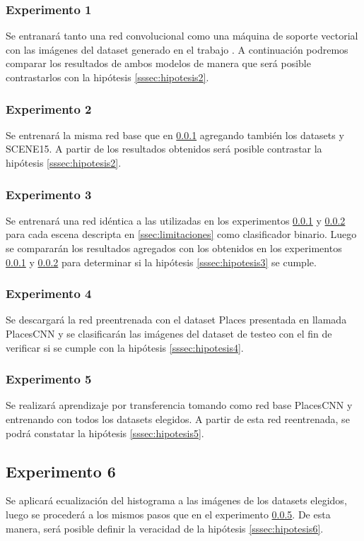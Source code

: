 \subsubsection{Experimento 1} \label{sssec:exp1}
Se entranará tanto una red convolucional como una máquina de soporte vectorial con las imágenes del dataset generado en el trabajo \cite{vision_based_real_estate_price_estimation}. A continuación podremos comparar los resultados de ambos modelos de manera que será posible contrastarlos con la hipótesis \ref{sssec:hipotesis2}.

\subsubsection{Experimento 2} \label{sssec:exp2}
Se entrenará la misma red base que en \ref{sssec:exp1} agregando también los datasets \cite{lstm_real_estate} y SCENE15. A partir de los resultados obtenidos será posible contrastar la hipótesis \ref{sssec:hipotesis2}.

\subsubsection{Experimento 3} \label{sssec:exp3}
Se entrenará una red idéntica a las utilizadas en los experimentos \ref{sssec:exp1} y \ref{sssec:exp2} para cada escena descripta en \ref{ssec:limitaciones} como clasificador binario. Luego se compararán los resultados agregados con los obtenidos en los experimentos \ref{sssec:exp1} y \ref{sssec:exp2} para determinar si la hipótesis \ref{sssec:hipotesis3} se cumple.

\subsubsection{Experimento 4} \label{sssec:exp4}
Se descargará la red preentrenada con el dataset Places presentada en \cite{learning_deep_features} llamada PlacesCNN y se clasificarán las imágenes del dataset de testeo con el fin de verificar si se cumple con la hipótesis \ref{sssec:hipotesis4}.

\subsubsection{Experimento 5} \label{sssec:exp5}
Se realizará aprendizaje por transferencia tomando como red base PlacesCNN y entrenando con todos los datasets elegidos. A partir de esta red reentrenada, se podrá constatar la hipótesis \ref{sssec:hipotesis5}.

\subsection{Experimento 6} \label{sssec:exp6}
Se aplicará ecualización del histograma a las imágenes de los datasets elegidos, luego se procederá a los mismos pasos que en el experimento \ref{sssec:exp5}. De esta manera, será posible definir la veracidad de la hipótesis \ref{sssec:hipotesis6}.



